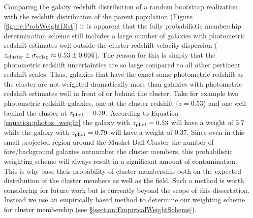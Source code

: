 Comparing the galaxy redshift distribution of a random bootstrap realization with the redshift distribution of the parent population (Figure \ref{figure:ProbWeightDist}) it is apparent that the fully probabilistic membership determination scheme still includes a large number of galaxies with photometric redshift estimates well outside the cluster redshift velocity dispersion ($z_{\rm cluster}\pm\sigma_{\rm vdisp} \approx 0.53\pm0.004$).
The reason for this is simply that the photometric redshift uncertainties are so large compared to all other pertinent redshift scales.
Thus, galaxies that have the exact same photometric redshift as the cluster are not weighted dramatically more than galaxies with photometric redshift estimates well in front of or behind the cluster.
Take for example two photometric redshift galaxies, one at the cluster redshift ($z=0.53$) and one well behind the cluster at $z_{\rm phot}=0.79$.
According to Equation \ref{equation:photoz_weight} the galaxy with $z_{\rm phot}=0.53$ will have a weight of 3.7 while the galaxy with $z_{\rm phot}=0.79$ will have a weight of 0.37.
Since even in this small projected region around the Musket Ball Cluster the number of fore/background galaxies outnumber the cluster members, this probabilistic weighting scheme will always result in a significant amount of contamination.
This is why \citet{George:2011kv} base their probability of cluster membership both on the expected distribution of the cluster members as well as the field.
Such a method is worth considering for future work but is currently beyond the scope of this dissertation.
Instead we use an empirically based method to determine our weighting scheme for cluster membership (see \S\ref{section:EmpiricalWeightScheme}). 


